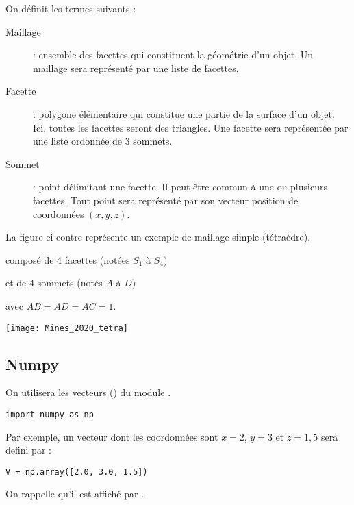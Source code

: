 \begin{minipage}{0.55\linewidth}
On définit les termes suivants :

\begin{description}
\item[Maillage] : ensemble des facettes qui constituent la géométrie d’un objet. Un maillage sera
représenté par une liste de facettes.
\item[Facette] : polygone élémentaire qui constitue une partie de la surface d’un objet. Ici, toutes les
facettes seront des triangles. Une facette sera représentée par une liste ordonnée de 3 sommets.
\item[Sommet] : point délimitant une facette. Il peut être commun à une ou plusieurs facettes. Tout
point sera représenté par son vecteur position de coordonnées $(x,y,z)$. 
\end{description}

La figure ci-contre représente un exemple de maillage simple (tétraèdre), 

composé de 4 facettes (notées $S_1$ à $S_4$) 

et de 4 sommets (notés $A$ à $D$) 

avec $AB = AD = AC = 1$. 
\end{minipage}
\begin{minipage}{0.45\linewidth}
\begin{center}
\texttt{[image: Mines\_2020\_tetra]}
\end{center}
\end{minipage}
\newpage
\subsection*{Numpy} 
On utilisera les vecteurs () du module .
\begin{lstlisting}
import numpy as np
\end{lstlisting}
Par exemple, un vecteur dont les coordonnées sont $x = 2$, $y = 3$ et $z = 1,5$ sera defini par :
\begin{lstlisting}
V = np.array([2.0, 3.0, 1.5])
\end{lstlisting}
On rappelle qu'il est affiché par .

